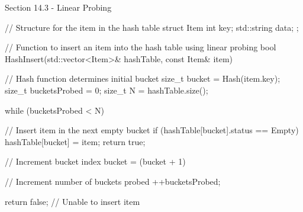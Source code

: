 \begin{notes}{Section 14.3 - Linear Probing}
\begin{highlight}
    \begin{code}[C++]
    // Structure for the item in the hash table
    struct Item {
        int key;
        std::string data;
    };
    
    // Function to insert an item into the hash table using linear probing
    bool HashInsert(std::vector<Item>& hashTable, const Item& item) {
        // Hash function determines initial bucket
        size_t bucket = Hash(item.key);
        size_t bucketsProbed = 0;
        size_t N = hashTable.size();
    
        while (bucketsProbed < N) {
            // Insert item in the next empty bucket
            if (hashTable[bucket].status == Empty) {
                hashTable[bucket] = item;
                return true;
            }
    
            // Increment bucket index
            bucket = (bucket + 1) %
    
            // Increment number of buckets probed
            ++bucketsProbed;
        }
    
        return false; // Unable to insert item
    }
    \end{code}
    \end{highlight}
\end{notes}

